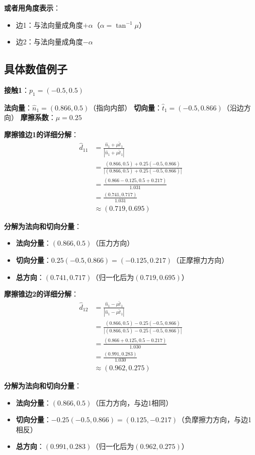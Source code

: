 \documentclass[12pt,a4paper]{article}
\begin{document}
\textbf{或者用角度表示}：
\begin{itemize}
\item 边1：与法向量成角度$+\alpha$（$\alpha = \tan^{-1}\mu$）
\item 边2：与法向量成角度$-\alpha$
\end{itemize}

\subsection{具体数值例子}

\textbf{接触1}：$p_1 = (-0.5, 0.5)$

\textbf{法向量}：$\hat{n}_1 = (0.866, 0.5)$（指向内部）
\textbf{切向量}：$\hat{t}_1 = (-0.5, 0.866)$（沿边方向）
\textbf{摩擦系数}：$\mu = 0.25$

\textbf{摩擦锥边1的详细分解}：
\begin{align}
\hat{d}_{11} &= \frac{\hat{n}_1 + \mu \hat{t}_1}{|\hat{n}_1 + \mu \hat{t}_1|} \\
&= \frac{(0.866, 0.5) + 0.25(-0.5, 0.866)}{|(0.866, 0.5) + 0.25(-0.5, 0.866)|} \\
&= \frac{(0.866 - 0.125, 0.5 + 0.217)}{1.031} \\
&= \frac{(0.741, 0.717)}{1.031} \\
&\approx (0.719, 0.695)
\end{align}

\textbf{分解为法向和切向分量}：
\begin{itemize}
\item \textbf{法向分量}：$(0.866, 0.5)$（压力方向）
\item \textbf{切向分量}：$0.25(-0.5, 0.866) = (-0.125, 0.217)$（正摩擦力方向）
\item \textbf{总方向}：$(0.741, 0.717)$（归一化后为$(0.719, 0.695)$）
\end{itemize}

\textbf{摩擦锥边2的详细分解}：
\begin{align}
\hat{d}_{12} &= \frac{\hat{n}_1 - \mu \hat{t}_1}{|\hat{n}_1 - \mu \hat{t}_1|} \\
&= \frac{(0.866, 0.5) - 0.25(-0.5, 0.866)}{|(0.866, 0.5) - 0.25(-0.5, 0.866)|} \\
&= \frac{(0.866 + 0.125, 0.5 - 0.217)}{1.030} \\
&= \frac{(0.991, 0.283)}{1.030} \\
&\approx (0.962, 0.275)
\end{align}

\textbf{分解为法向和切向分量}：
\begin{itemize}
\item \textbf{法向分量}：$(0.866, 0.5)$（压力方向，与边1相同）
\item \textbf{切向分量}：$-0.25(-0.5, 0.866) = (0.125, -0.217)$（负摩擦力方向，与边1相反）
\item \textbf{总方向}：$(0.991, 0.283)$（归一化后为$(0.962, 0.275)$）
\end{itemize}
\end{document}
